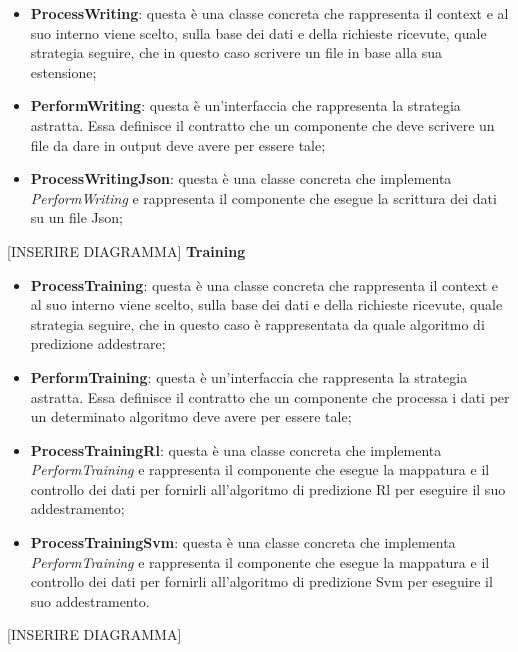 			\begin{itemize}
				\item \textbf{ProcessWriting}: questa è una classe concreta che rappresenta il context e al suo interno viene scelto, sulla base dei dati e della richieste ricevute, quale strategia seguire, che in questo caso scrivere un file in base alla sua estensione;
				\item \textbf{PerformWriting}: questa è un'interfaccia che rappresenta la strategia astratta. Essa definisce il contratto che un componente che deve scrivere un file da dare in output deve avere per essere tale;
				\item \textbf{ProcessWritingJson}: questa è una classe concreta che implementa \textit{PerformWriting} e rappresenta il componente che esegue la scrittura dei dati su un file Json;
			\end{itemize}
			[INSERIRE DIAGRAMMA]
			\textbf{Training} \mbox{} \\ 
			\begin{itemize}
				\item \textbf{ProcessTraining}: questa è una classe concreta che rappresenta il context e al suo interno viene scelto, sulla base dei dati e della richieste ricevute, quale strategia seguire, che in questo caso è rappresentata da quale algoritmo di predizione addestrare;
				\item \textbf{PerformTraining}: questa è un'interfaccia che rappresenta la strategia astratta. Essa definisce il contratto che un componente che processa i dati per un determinato algoritmo deve avere per essere tale;
				\item \textbf{ProcessTrainingRl}: questa è una classe concreta che implementa \textit{PerformTraining} e rappresenta il componente che esegue la mappatura e il controllo dei dati per fornirli all'algoritmo di predizione Rl per eseguire il suo addestramento;
				\item \textbf{ProcessTrainingSvm}: questa è una classe concreta che implementa \textit{PerformTraining} e rappresenta il componente che esegue la mappatura e il controllo dei dati per fornirli all'algoritmo di predizione Svm per eseguire il suo addestramento.
			\end{itemize}
			[INSERIRE DIAGRAMMA]